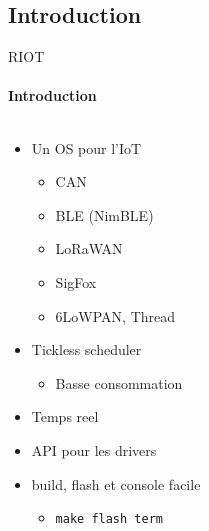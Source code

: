 \subsection{Introduction}

\begin{frame}{RIOT}
\framesubtitle{Introduction}
\begin{columns}
\begin{column}{0.5\textwidth}
 \begin{itemize}
  \item Un OS pour l'IoT
  \begin{itemize}
    \item CAN
    \item BLE (NimBLE)
    \item LoRaWAN
    \item SigFox
    \item 6LoWPAN, Thread
  \end{itemize}
  \item Tickless scheduler
  \begin{itemize}
    \item Basse consommation
  \end{itemize}
  \item Temps reel
  \item API pour les drivers
  \item build, flash et console facile
  \begin{itemize}
    \item \lstinline{make flash term}
  \end{itemize}
\end{itemize}
\end{column}
\begin{column}{0.5\textwidth}
\end{column}
\end{columns}
\end{frame}

